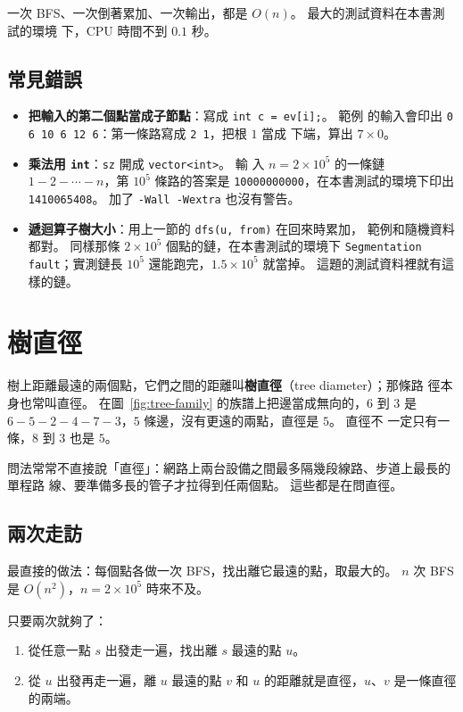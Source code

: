 一次 BFS、一次倒著累加、一次輸出，都是 $O(n)$。 最大的測試資料在本書測試的環境
下，CPU 時間不到 $0.1$ 秒。

\subsection{常見錯誤}

\begin{itemize}
\item \textbf{把輸入的第二個點當成子節點}：寫成 \texttt{int c = ev[i];}。 範例
的輸入會印出 \texttt{0 6 10 6 12 6}：第一條路寫成 \texttt{2 1}，把根 $1$ 當成
下端，算出 $7 \times 0$。
\item \textbf{乘法用 \texttt{int}}：\texttt{sz} 開成 \texttt{vector<int>}。 輸
入 $n = 2 \times 10^5$ 的一條鏈 $1 - 2 - \cdots - n$，第 $10^5$ 條路的答案是
\texttt{10000000000}，在本書測試的環境下印出 \texttt{1410065408}。 加了
\texttt{-Wall -Wextra} 也沒有警告。
\item \textbf{遞迴算子樹大小}：用上一節的 \texttt{dfs(u, from)} 在回來時累加，
範例和隨機資料都對。 同樣那條 $2 \times 10^5$ 個點的鏈，在本書測試的環境下
\texttt{Segmentation fault}；實測鏈長 $10^5$ 還能跑完，$1.5 \times 10^5$ 就當掉。
這題的測試資料裡就有這樣的鏈。
\end{itemize}

\section{樹直徑}
\label{sec:tree-diameter}

樹上距離最遠的兩個點，它們之間的距離叫\textbf{樹直徑}（tree diameter）；那條路
徑本身也常叫直徑。 在圖~\ref{fig:tree-family} 的族譜上把邊當成無向的，$6$ 到
$3$ 是 $6 - 5 - 2 - 4 - 7 - 3$，$5$ 條邊，沒有更遠的兩點，直徑是 $5$。 直徑不
一定只有一條，$8$ 到 $3$ 也是 $5$。

問法常常不直接說「直徑」：網路上兩台設備之間最多隔幾段線路、步道上最長的單程路
線、要準備多長的管子才拉得到任兩個點。 這些都是在問直徑。

\subsection{兩次走訪}

最直接的做法：每個點各做一次 BFS，找出離它最遠的點，取最大的。 $n$ 次 BFS 是
$O(n^2)$，$n = 2 \times 10^5$ 時來不及。

只要兩次就夠了：

\begin{enumerate}
\item 從任意一點 $s$ 出發走一遍，找出離 $s$ 最遠的點 $u$。
\item 從 $u$ 出發再走一遍，離 $u$ 最遠的點 $v$ 和 $u$ 的距離就是直徑，$u$、$v$
是一條直徑的兩端。
\end{enumerate}

